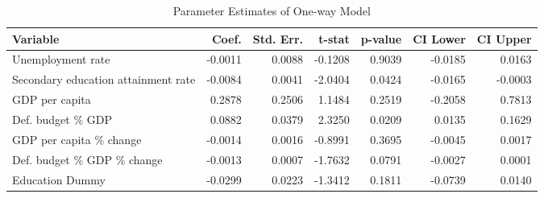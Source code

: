 \clearpage

\begin{table}[htbp]
\caption{Parameter Estimates of One-way Model}
\centering
\begin{threeparttable}
\begin{tabularx}{\textwidth}{@{}Xrrrrrr@{}}
\toprule
\textbf{Variable} & \textbf{Coef.} & \textbf{Std. Err.} & \textbf{t-stat} & \textbf{p-value} & \textbf{CI Lower} & \textbf{CI Upper} \\
\midrule
Unemployment rate & -0.0011 & 0.0088 & -0.1208 & 0.9039 & -0.0185 & 0.0163 \\
Secondary education attainment rate & -0.0084 & 0.0041 & -2.0404 & 0.0424 & -0.0165 & -0.0003 \\
GDP per capita & 0.2878 & 0.2506 & 1.1484 & 0.2519 & -0.2058 & 0.7813 \\
Def. budget \% GDP & 0.0882 & 0.0379 & 2.3250 & 0.0209 & 0.0135 & 0.1629 \\
GDP per capita \% change & -0.0014 & 0.0016 & -0.8991 & 0.3695 & -0.0045 & 0.0017 \\
Def. budget \% GDP \% change & -0.0013 & 0.0007 & -1.7632 & 0.0791 & -0.0027 & 0.0001 \\
Education Dummy & -0.0299 & 0.0223 & -1.3412 & 0.1811 & -0.0739 & 0.0140 \\
\bottomrule
\end{tabularx}
\end{threeparttable}
\label{tab:oneway_model}
\end{table}

